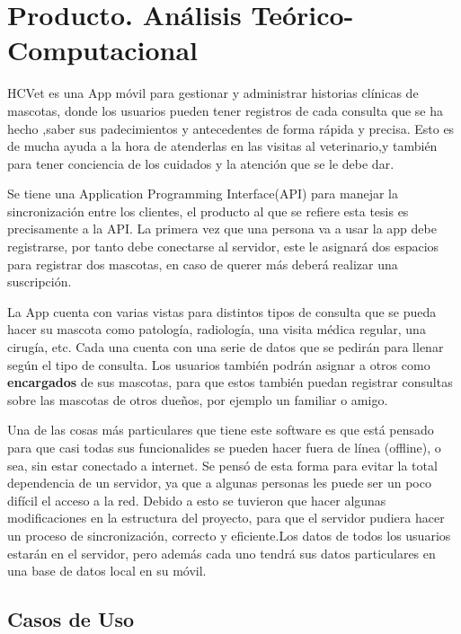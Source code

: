 \chapter{Producto. Análisis Teórico-Computacional}\label{chapter:proposal}

HCVet es una App móvil para gestionar y administrar historias clínicas de mascotas, donde los usuarios pueden tener registros de cada consulta que se ha hecho ,saber sus padecimientos y antecedentes de forma rápida y precisa. Esto es de mucha ayuda a la hora de atenderlas en las visitas al veterinario,y también para tener conciencia de los cuidados y la atención que se le debe dar.

Se tiene una Application Programming Interface(API) para manejar la sincronización entre los clientes, el producto al que se refiere esta tesis es precisamente a la API. La primera vez que una persona va a usar la app debe registrarse, por tanto debe conectarse al servidor, este le asignará dos espacios para registrar dos mascotas, en caso de querer más deberá realizar una suscripción.

La App cuenta con varias vistas para distintos tipos de consulta que se pueda hacer su mascota como patología, radiología, una visita médica regular, una cirugía, etc. Cada una cuenta con una serie de datos que se pedirán para llenar según el tipo de consulta. Los usuarios también podrán asignar a otros como \textbf{encargados} de sus mascotas, para que estos también puedan registrar consultas sobre  las mascotas de otros dueños, por ejemplo un familiar o amigo.

Una de las cosas más particulares que tiene este software es que está pensado para que casi todas sus funcionalides se pueden hacer fuera de línea (offline), o sea, sin estar conectado a internet. Se pensó de esta forma para evitar la total dependencia de un servidor, ya que a algunas personas les puede ser un poco difícil el acceso a la red. Debido a esto se tuvieron que hacer algunas modificaciones en la estructura del proyecto, para que el servidor pudiera hacer un proceso de sincronización, correcto y eficiente.Los datos de todos los usuarios estarán en el servidor, pero además cada uno tendrá sus datos particulares en una base de datos local en su móvil. 

\section{Casos de Uso}


